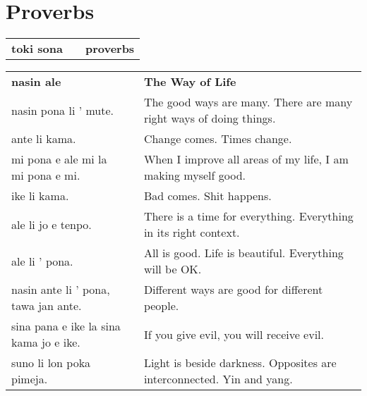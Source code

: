 
\section{Proverbs}

\begin{supertabular}{p{6cm}|ll}
    \textbf{toki sona} &  & \textbf{proverbs} \\
\end{supertabular}

\begin{supertabular}{p{6cm}|ll}
    \textbf{nasin ale}                                 &  & \textbf{The Way of Life}                                              \\
    nasin pona li ' mute.                              &  & The good ways are many. There are many right ways of doing things.    \\
    ante li kama.                                      &  & Change comes. Times change.                                           \\
    mi pona e ale mi la mi pona e mi.                  &  & When I improve all areas of my life, I am making myself good.         \\
    ike li kama.                                       &  & Bad comes. Shit happens.                                              \\
    ale li jo e tenpo.                                 &  & There is a time for everything. Everything in its right context.      \\
    ale li ' pona.                                     &  & All is good. Life is beautiful. Everything will be OK.                \\
    nasin ante li ' pona, tawa jan ante.               &  & Different ways are good for different people.                         \\
    sina pana e ike la sina kama jo e ike.             &  & If you give evil, you will receive evil.                              \\
    suno li lon poka pimeja.                           &  & Light is beside darkness. Opposites are interconnected. Yin and yang. \\

\end{supertabular}
